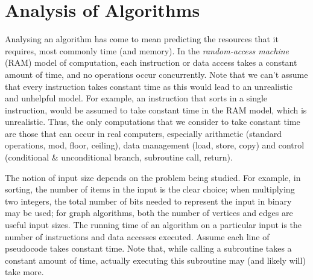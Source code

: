 \documentclass[12pt]{article}
\begin{document}
\section{Analysis of Algorithms}
Analysing an algorithm has come to mean predicting the resources that it requires, most commonly time (and memory). In the \textit{random-access
machine} (RAM) model of computation, each instruction or data access takes a constant amount of time, and
no operations occur concurrently. Note that we can't assume that every instruction takes constant time as this
would lead to an unrealistic and unhelpful model. For example, an instruction that sorts in a single instruction,
would be assumed to take constant time in the RAM model, which is unrealistic. Thus, the only computations that we consider
to take constant time are those that can occur in real computers, especially arithmetic (standard operations, mod, floor, ceiling), data
management (load, store, copy) and control (conditional \& unconditional branch, subroutine call, return).

The notion of input size depends on the problem being studied. For example, in sorting, the number of items in the input
is the clear choice; when multiplying two integers, the total number of bits needed to represent the input in binary
may be used; for graph algorithms, both the number of vertices and edges are useful input sizes. The running time of an
algorithm on a particular input is the number of instructions and data accesses executed. Assume each line of pseudocode takes
constant time. Note that, while calling a subroutine takes a constant amount of time, actually executing this subroutine may (and
likely will) take more.
\end{document}
